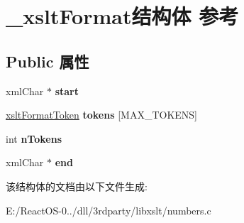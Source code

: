 \hypertarget{struct__xslt_format}{}\section{\+\_\+xslt\+Format结构体 参考}
\label{struct__xslt_format}
\subsection*{Public 属性}
\begin{DoxyCompactItemize}
\item 
\mbox{\label{struct__xslt_format_a5b0db272df9cfb6137d9195aa3f48389}} 
xml\+Char $\ast$ {\bfseries start}
\item 
\mbox{\label{struct__xslt_format_a242e950a6b85b4dd2578546e5fdf5a5d}} 
\hyperlink{struct__xslt_format_token}{xslt\+Format\+Token} {\bfseries tokens} \mbox{[}M\+A\+X\+\_\+\+T\+O\+K\+E\+NS\mbox{]}
\item 
\mbox{\label{struct__xslt_format_aeabcdfac55266ba49e01580663aef34b}} 
int {\bfseries n\+Tokens}
\item 
\mbox{\label{struct__xslt_format_aab7f8b67b39c379981c30cda861b099b}} 
xml\+Char $\ast$ {\bfseries end}
\end{DoxyCompactItemize}


该结构体的文档由以下文件生成\+:\begin{DoxyCompactItemize}
\item 
E\+:/\+React\+O\+S-\/0../dll/3rdparty/libxslt/numbers.\+c\end{DoxyCompactItemize}
